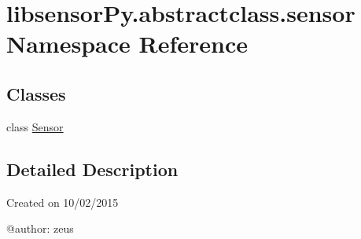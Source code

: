 \hypertarget{namespacelibsensorPy_1_1abstractclass_1_1sensor}{}\section{libsensor\+Py.\+abstractclass.\+sensor Namespace Reference}
\label{namespacelibsensorPy_1_1abstractclass_1_1sensor}
\subsection*{Classes}
\begin{DoxyCompactItemize}
\item 
class \hyperlink{classlibsensorPy_1_1abstractclass_1_1sensor_1_1Sensor}{Sensor}
\end{DoxyCompactItemize}


\subsection{Detailed Description}
\begin{DoxyVerb}Created on 10/02/2015

@author: zeus
\end{DoxyVerb}
 